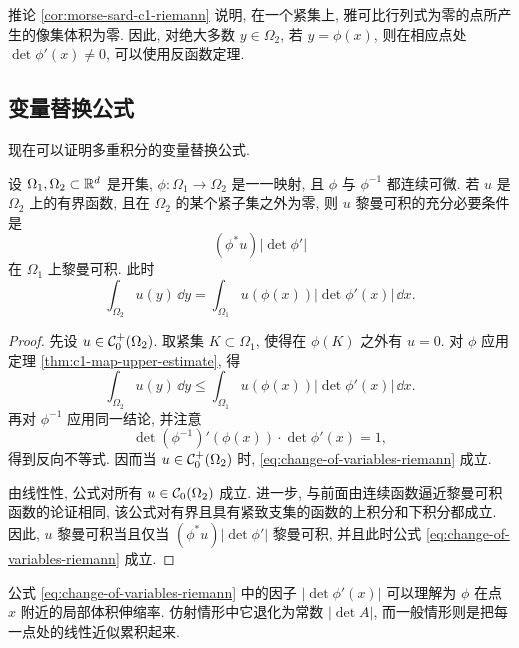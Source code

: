 \begin{rem}
	推论 \ref{cor:morse-sard-c1-riemann} 说明, 在一个紧集上, 雅可比行列式为零的点所产生的像集体积为零. 因此, 对绝大多数 \(y\in\Omega_2\), 若 \(y=\phi(x)\), 则在相应点处 \(\det\phi'(x)\neq0\), 可以使用反函数定理.
\end{rem}

\subsection{变量替换公式}

现在可以证明多重积分的变量替换公式.

\begin{thm}[变量替换公式]
	\label{thm:change-of-variables-riemann}
	设 \(\Omega_1,\Omega_2\subset\mathbb{R}^d\) 是开集, \(\phi:\Omega_1\to\Omega_2\) 是一一映射, 且 \(\phi\) 与 \(\phi^{-1}\) 都连续可微. 若 \(u\) 是 \(\Omega_2\) 上的有界函数, 且在 \(\Omega_2\) 的某个紧子集之外为零, 则 \(u\) 黎曼可积的充分必要条件是
	\[
	(\phi^*u)|\det\phi'|
	\]
	在 \(\Omega_1\) 上黎曼可积. 此时
	\begin{equation}
		\int_{\Omega_2}u(y)\,\dd y
		=
		\int_{\Omega_1}u(\phi(x))|\det\phi'(x)|\,\dd x.
		\label{eq:change-of-variables-riemann}
	\end{equation}
\end{thm}

\begin{proof}
	先设 \(u\in\mathcal{C}_0^+(\Omega_2)\). 取紧集 \(K\subset\Omega_1\), 使得在 \(\phi(K)\) 之外有 \(u=0\). 对 \(\phi\) 应用定理 \ref{thm:c1-map-upper-estimate}, 得
	\[
	\int_{\Omega_2}u(y)\,\dd y
	\leq
	\int_{\Omega_1}u(\phi(x))|\det\phi'(x)|\,\dd x.
	\]
	再对 \(\phi^{-1}\) 应用同一结论, 并注意
	\[
	\det (\phi^{-1})'(\phi(x))\cdot \det\phi'(x)=1,
	\]
	得到反向不等式. 因而当 \(u\in\mathcal{C}_0^+(\Omega_2)\) 时, \eqref{eq:change-of-variables-riemann} 成立.
	
	由线性性, 公式对所有 \(u\in\mathcal{C}_0(\Omega_2)\) 成立. 进一步, 与前面由连续函数逼近黎曼可积函数的论证相同, 该公式对有界且具有紧致支集的函数的上积分和下积分都成立. 因此, \(u\) 黎曼可积当且仅当 \((\phi^*u)|\det\phi'|\) 黎曼可积, 并且此时公式 \eqref{eq:change-of-variables-riemann} 成立.
\end{proof}

\begin{rem}
	公式 \eqref{eq:change-of-variables-riemann} 中的因子 \(|\det\phi'(x)|\) 可以理解为 \(\phi\) 在点 \(x\) 附近的局部体积伸缩率. 仿射情形中它退化为常数 \(|\det A|\), 而一般情形则是把每一点处的线性近似累积起来.
\end{rem}

